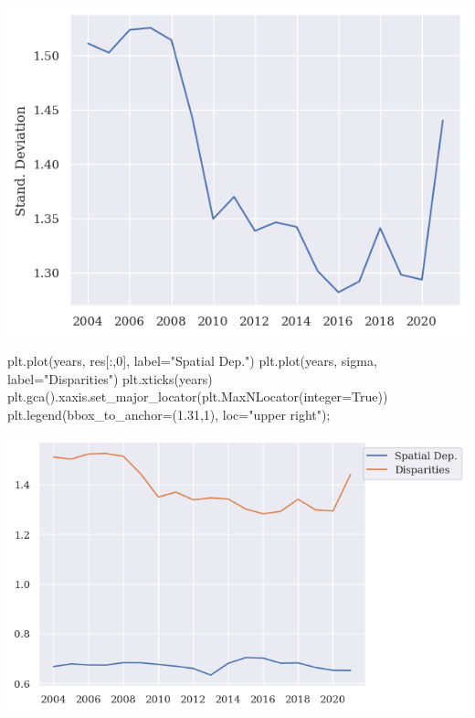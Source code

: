 \documentclass[
  letterpaper,
  DIV=11,
  numbers=noendperiod]{scrreprt}
\newenvironment{Shaded}{\begin{snugshade}}{\end{snugshade}}
\newcommand{\DecValTok}[1]{\textcolor[rgb]{0.68,0.00,0.00}{#1}}
\newcommand{\FloatTok}[1]{\textcolor[rgb]{0.68,0.00,0.00}{#1}}
\newcommand{\NormalTok}[1]{\textcolor[rgb]{0.00,0.23,0.31}{#1}}
\newcommand{\OperatorTok}[1]{\textcolor[rgb]{0.37,0.37,0.37}{#1}}
\newcommand{\StringTok}[1]{\textcolor[rgb]{0.13,0.47,0.30}{#1}}
\newcommand{\VariableTok}[1]{\textcolor[rgb]{0.07,0.07,0.07}{#1}}
\begin{document}
\includegraphics{labs/final_informal_files/figure-pdf/cell-25-output-1.png}

\begin{Shaded}
\begin{Highlighting}[]
\NormalTok{plt.plot(years, res[:,}\DecValTok{0}\NormalTok{], label}\OperatorTok{=}\StringTok{"Spatial Dep."}\NormalTok{)}
\NormalTok{plt.plot(years, sigma,  label}\OperatorTok{=}\StringTok{"Disparities"}\NormalTok{)}
\NormalTok{plt.xticks(years)}
\NormalTok{plt.gca().xaxis.set\_major\_locator(plt.MaxNLocator(integer}\OperatorTok{=}\VariableTok{True}\NormalTok{))}
\NormalTok{plt.legend(bbox\_to\_anchor}\OperatorTok{=}\NormalTok{(}\FloatTok{1.31}\NormalTok{,}\DecValTok{1}\NormalTok{), loc}\OperatorTok{=}\StringTok{"upper right"}\NormalTok{)}\OperatorTok{;}
\end{Highlighting}
\end{Shaded}

\includegraphics{labs/final_informal_files/figure-pdf/cell-26-output-1.png}
\end{document}
